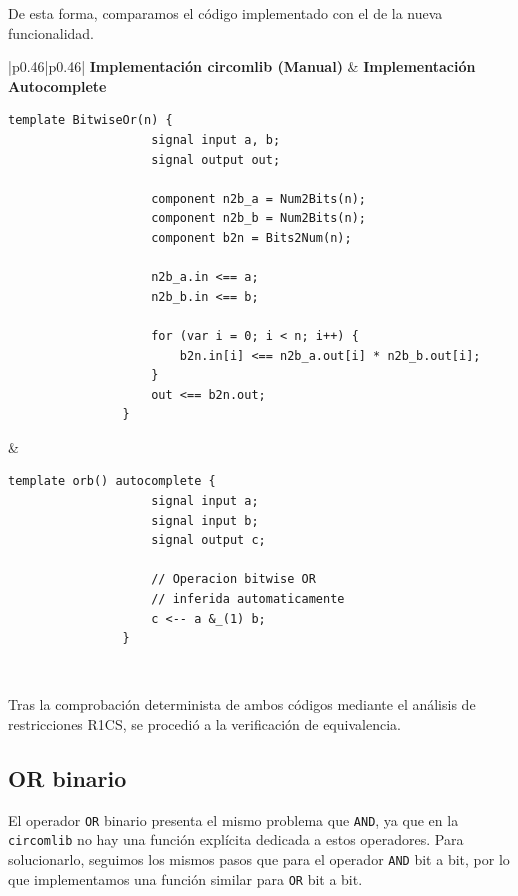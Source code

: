 \documentclass[a4paper,12pt]{report}
\begin{document}
	\vspace{0.2cm}
	\noindent De esta forma, comparamos el código implementado con el de la nueva funcionalidad.
	
	\begin{table}[h!]
		\caption{Comparativa de la operación OR bit a bit (1 bit) entre la implementación estándar y el uso de autocomplete.}
		\label{tab:comparativa-andb}
		
		\centering
		\small %
		\begin{tabular}{|p{}|p{}|}
			\hline
			\centering \textbf{Implementación circomlib (Manual)} & \centering \textbf{Implementación Autocomplete} \cr \hline
			\begin{lstlisting}[language=Circom, basicstyle=\tiny\ttfamily, numbers=none, frame=none, xleftmargin=0pt]
				template BitwiseOr(n) {
					signal input a, b;
					signal output out;
					
					component n2b_a = Num2Bits(n);
					component n2b_b = Num2Bits(n);
					component b2n = Bits2Num(n);
					
					n2b_a.in <== a;
					n2b_b.in <== b;
					
					for (var i = 0; i < n; i++) {
						b2n.in[i] <== n2b_a.out[i] * n2b_b.out[i];
					}
					out <== b2n.out;
				}
			\end{lstlisting} 
			& 
			\begin{lstlisting}[language=Circom, basicstyle=\tiny\ttfamily, numbers=none, frame=none, xleftmargin=0pt]
				template orb() autocomplete {
					signal input a;
					signal input b;
					signal output c;
					
					// Operacion bitwise OR 
					// inferida automaticamente
					c <-- a &_(1) b;
				}
			\end{lstlisting} \\ \hline
		\end{tabular}
		
	\end{table}
	
	\vspace{0.2cm}
	\noindent Tras la comprobación determinista de ambos códigos mediante el análisis de restricciones R1CS, se procedió a la verificación de equivalencia.
	
	\subsection{OR binario}
	\label{sec:ver-orbinario}
	\noindent El operador \texttt{OR} binario presenta el mismo problema que \texttt{AND}, ya que en la \texttt{circomlib} no hay una función explícita dedicada a estos operadores. Para solucionarlo, seguimos los mismos pasos que para el operador \texttt{AND} bit a bit, por lo que implementamos una función similar para \texttt{OR} bit a bit.
	
\end{document}
